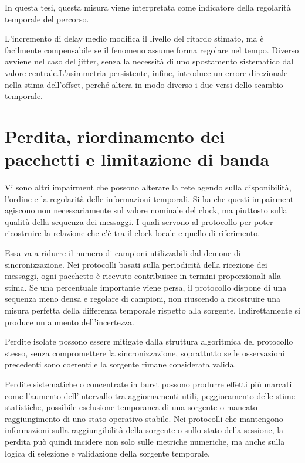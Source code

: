 In questa tesi, questa misura viene interpretata come indicatore della regolarità temporale del percorso.

L'incremento di delay medio modifica il livello del ritardo stimato, ma è
facilmente compensabile se il fenomeno assume forma regolare nel tempo. Diverso avviene
nel caso del jitter, senza la necessità di uno spostamento sistematico dal valore
centrale.L'asimmetria persistente, infine, introduce un errore direzionale nella
stima dell'offset, perché altera in modo diverso i due versi dello scambio temporale.

\section{Perdita, riordinamento dei pacchetti e limitazione di banda}
Vi sono altri impairment che possono alterare la rete agendo sulla disponibilità,
l'ordine e la regolarità delle informazioni temporali.
Si ha che questi impairment agiscono non necessariamente sul valore nominale del clock, 
ma piuttosto sulla qualità della sequenza dei messaggi. I quali servono al protocollo per poter
 ricostruire la relazione che c'è tra il clock locale e quello di riferimento.

Essa va a ridurre il numero di campioni utilizzabili dal
demone di sincronizzazione. Nei protocolli basati sulla periodicità della ricezione
dei messaggi, ogni pacchetto è ricevuto contribuisce in termini proporzionali
alla stima. Se una percentuale importante viene persa, il protocollo dispone di
una sequenza meno densa e regolare di campioni, non riuscendo a ricostruire una misura
perfetta della differenza temporale rispetto alla sorgente.
Indirettamente si produce un aumento dell'incertezza.

Perdite isolate possono essere mitigate dalla struttura algoritmica del protocollo
stesso, senza compromettere la sincronizzazione, soprattutto se le osservazioni precedenti
sono coerenti e la sorgente rimane considerata valida.

Perdite sistematiche o concentrate in burst possono produrre effetti più marcati come
l'aumento dell'intervallo tra aggiornamenti utili, peggioramento delle stime
statistiche, possibile esclusione temporanea di una sorgente o mancato raggiungimento
di uno stato operativo stabile. Nei protocolli che mantengono informazioni sulla
raggiungibilità della sorgente o sullo stato della sessione, la perdita può quindi
incidere non solo sulle metriche numeriche, ma anche sulla logica di selezione e
validazione della sorgente temporale.

